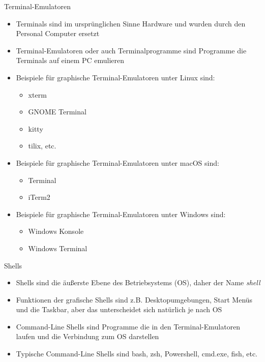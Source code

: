\begin{frame}{Terminal-Emulatoren}
  \begin{itemize}
    \item Terminals sind im ursprünglichen Sinne Hardware und wurden durch den Personal Computer ersetzt
    \item Terminal-Emulatoren oder auch Terminalprogramme sind Programme die Terminals auf einem PC emulieren
    \item Beispiele für graphische Terminal-Emulatoren unter Linux sind: 
    \begin{itemize}
      \item xterm
      \item GNOME Terminal
      \item kitty
      \item tilix, etc.
    \end{itemize}
    \item Beispiele für graphische Terminal-Emulatoren unter macOS sind: 
    \begin{itemize}
      \item Terminal 
      \item iTerm2
    \end{itemize}
    \item Beispiele für graphische Terminal-Emulatoren unter Windows sind: 
    \begin{itemize}
      \item Windows Konsole
      \item Windows Terminal
    \end{itemize}
  
  \end{itemize}
\end{frame}

\begin{frame}{Shells}
  \begin{itemize}
    \item Shells sind die äußerste Ebene des Betriebsystems (OS), daher der Name \textit{shell}
    \item Funktionen der grafische Shells sind z.B. Desktopumgebungen, Start Menüs und die Taskbar, aber das unterscheidet sich natürlich je nach OS 
    \item Command-Line Shells sind Programme die in den Terminal-Emulatoren  laufen und die Verbindung zum OS darstellen
    \item Typische Command-Line Shells sind bash, zsh, Powershell, cmd.exe, fish, etc.
  \end{itemize}
\end{frame}


